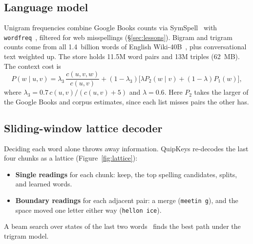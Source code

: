 \documentclass[11pt,a4paper]{article}
\newcommand{\qk}{QuipKeys}
\newcommand{\ttw}[1]{\texttt{#1}}
\begin{document}
\subsection{Language model}
Unigram frequencies combine Google Books counts via SymSpell~\citep{garbe2012symspell,michel2011} with \ttw{wordfreq}~\citep{speer2018wordfreq}, filtered for web misspellings (\S\ref{sec:lessons}). Bigram and trigram counts come from all 1.4~billion words of English Wiki-40B~\citep{guo2020wiki40b}, plus conversational text weighted up. The store holds 11.5M word pairs and 13M triples (62~MB). The context cost is
\begin{equation}
P(w\mid u,v) = \lambda_3\,\frac{c(u,v,w)}{c(u,v)} + (1-\lambda_3)\big[\lambda P_2(w\mid v) + (1-\lambda) P_1(w)\big],
\end{equation}
where $\lambda_3 = 0.7\,c(u,v)/(c(u,v)+5)$ and $\lambda=0.6$. Here $P_2$ takes the larger of the Google Books and corpus estimates, since each list misses pairs the other has.

\subsection{Sliding-window lattice decoder}
Deciding each word alone throws away information. \qk{} re-decodes the last four chunks as a lattice (Figure~\ref{fig:lattice}):
\begin{itemize}
\item \textbf{Single readings} for each chunk: keep, the top spelling candidates, splits, and learned words.
\item \textbf{Boundary readings} for each adjacent pair: a merge (\ttw{meetin g}), and the space moved one letter either way (\ttw{hellon ice}).
\end{itemize}
A beam search over states of the last two words~\citep{rabiner1989} finds the best path under the trigram model.
\end{document}
